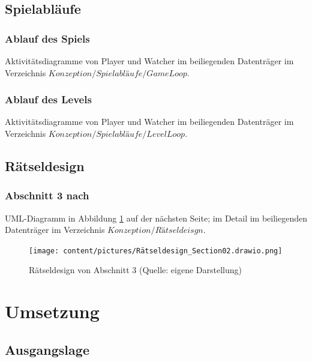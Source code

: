 \documentclass[
	12pt,
	a4paper,
	bibtotoc,
	cleardoubleempty, 
	idxtotoc,
	ngerman,
	openright
	final,
	listof=nochaptergap,
	]{scrbook}
\begin{document}
\begin{appendices}


\clearpage

\subsection{Spielabläufe}

\subsubsection{Ablauf des Spiels}\label{sec:append_gameloop}
Aktivitätsdiagramme von Player und Watcher im beiliegenden Datenträger im Verzeichnis $Konzeption/Spielabläufe/GameLoop$.

\subsubsection{Ablauf des Levels}\label{sec:append_levelloop}
Aktivitätsdiagramme von Player und Watcher im beiliegenden Datenträger im Verzeichnis $Konzeption/Spielabläufe/LevelLoop$.

\newpage

\subsection{Rätseldesign}

\subsubsection{Abschnitt 3 nach \cite{tim_schafer_grim_1996}}\label{sec:append_riddles_part_3}
UML-Diagramm in Abbildung \ref{fig:riddle-design-section02-uml} auf der nächsten Seite; im Detail im beiliegenden Datenträger im Verzeichnis $Konzeption/Rätseldeisgn$.

\begin{figure}[ht]
\centering
\texttt{[image: content/pictures/Rätseldesign\_Section02.drawio.png]}
\caption{Rätseldesign von Abschnitt 3 (Quelle: eigene Darstellung)}
\label{fig:riddle-design-section02-uml}
\end{figure}

\clearpage

\section{Umsetzung}

\subsection{Ausgangslage}


\end{appendices}
\end{document}
